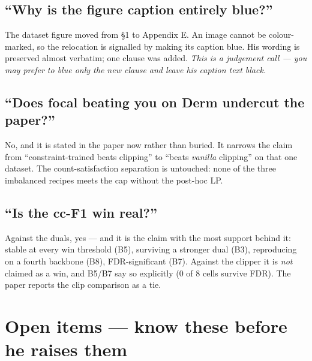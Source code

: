 \documentclass[11pt,a4paper]{article}
\begin{document}
\subsection{``Why is the figure caption entirely blue?''}
The dataset figure moved from \S1 to Appendix E. An image cannot be colour-marked, so the
relocation is signalled by making its caption blue. His wording is preserved almost
verbatim; one clause was added. \emph{This is a judgement call --- you may prefer to blue
only the new clause and leave his caption text black.}

\subsection{``Does focal beating you on Derm undercut the paper?''}
No, and it is stated in the paper now rather than buried. It narrows the claim from
``constraint-trained beats clipping'' to ``beats \emph{vanilla} clipping'' on that one
dataset. The count-satisfaction separation is untouched: none of the three imbalanced
recipes meets the cap without the post-hoc LP.

\subsection{``Is the cc-F1 win real?''}
Against the duals, yes --- and it is the claim with the most support behind it: stable at
every win threshold (B5), surviving a stronger dual (B3), reproducing on a fourth backbone
(B8), FDR-significant (B7). Against the clipper it is \emph{not} claimed as a win, and B5/B7
say so explicitly (0 of 8 cells survive FDR). The paper reports the clip comparison as a
tie.

\section{Open items --- know these before he raises them}
\end{document}

